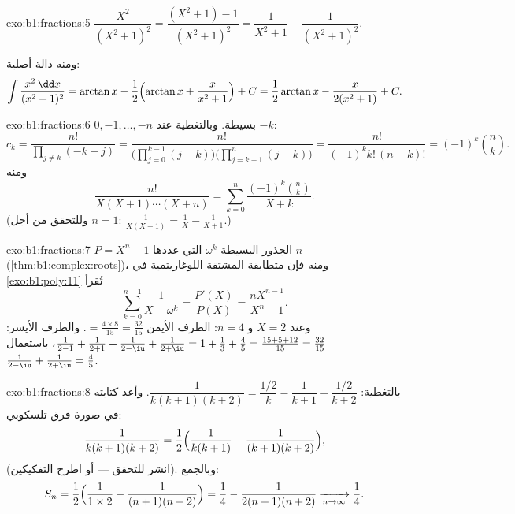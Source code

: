 \begin{solution}{exo:b1:fractions:5}
$\dfrac{X^2}{(X^2+1)^2} = \dfrac{(X^2 + 1) - 1}{(X^2+1)^2} =
\dfrac{1}{X^2+1} - \dfrac{1}{(X^2+1)^2}$.

ومنه دالة أصلية:
\[
\int \frac{x^2\,\dd x}{(x^2+1)^2}
= \arctan x - \frac12\Bigl(\arctan x + \frac{x}{x^2+1}\Bigr) + C
= \frac12\arctan x - \frac{x}{2(x^2+1)} + C .
\]
\end{solution}

\begin{solution}{exo:b1:fractions:6}
 $0, -1, \dots, -n$ بسيطة. وبالتغطية عند $-k$:
\[
c_k = \frac{n!}{\prod_{j \neq k} (-k + j)}
= \frac{n!}{\bigl(\prod_{j=0}^{k-1}(j - k)\bigr)
\bigl(\prod_{j=k+1}^{n}(j-k)\bigr)}
= \frac{n!}{(-1)^k k!\,(n-k)!} = (-1)^k \binom nk .
\]
ومنه
\[
\frac{n!}{X(X+1)\cdots(X+n)}
= \sum_{k=0}^{n} \frac{(-1)^k \binom nk}{X + k} .
\]
(وللتحقق من أجل $n = 1$: $\frac{1}{X(X+1)} = \frac1X -
\frac{1}{X+1}$.)
\end{solution}

\begin{solution}{exo:b1:fractions:7}
 $P = X^n - 1$ الجذور البسيطة $\omega^k$ التي عددها $n$
(\cref{thm:b1:complex:roots})، ومنه فإن متطابقة المشتقة اللوغاريتمية
في \cref{exo:b1:poly:11} تُقرأ
\[
\sum_{k=0}^{n-1} \frac{1}{X - \omega^k}
= \frac{P'(X)}{P(X)} = \frac{n X^{n-1}}{X^n - 1} .
\]
وعند $X = 2$ و $n = 4$: الطرف الأيمن $= \frac{4 \times 8}{15} =
\frac{32}{15}$. والطرف الأيسر: $\frac{1}{2-1} + \frac{1}{2+1} +
\frac{1}{2 - \iu} + \frac{1}{2 + \iu} = 1 + \frac13 + \frac{4}{5} =
\frac{15 + 5 + 12}{15} = \frac{32}{15}$، باستعمال $\frac{1}{2-\iu} +
\frac{1}{2+\iu} = \frac{4}{5}$.
\end{solution}

\begin{solution}{exo:b1:fractions:8}
بالتغطية: $\dfrac{1}{k(k+1)(k+2)} = \dfrac{1/2}{k} - \dfrac{1}{k+1} +
\dfrac{1/2}{k+2}$. وأعد كتابته في صورة فرق تلسكوبي:
\[
\frac{1}{k(k+1)(k+2)}
= \frac12\Bigl(\frac{1}{k(k+1)} - \frac{1}{(k+1)(k+2)}\Bigr),
\]
(انشر للتحقق --- أو اطرح التفكيكين). وبالجمع:
\[
S_n = \frac12\Bigl(\frac{1}{1 \times 2} - \frac{1}{(n+1)(n+2)}\Bigr)
= \frac14 - \frac{1}{2(n+1)(n+2)}
\xrightarrow[n \to \infty]{} \frac14 .
\]
\end{solution}

